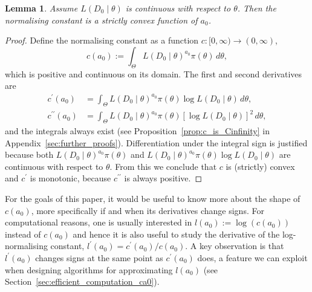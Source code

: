 \documentclass[a4paper, notitlepage, 11pt]{article}
\newtheorem{lemma}{Lemma}[]
\begin{document}
\begin{lemma}
\label{lm:convex_norm_constant}
Assume $L(D_0 \mid \theta)$ is continuous with respect to $\theta$.
Then the normalising constant is a strictly convex function of $a_0$.
\end{lemma}
\begin{proof}
Define the normalising constant as a function $c : [0, \infty) \to (0, \infty)$,
\begin{equation}
 \label{eq:normconst}
 c(a_0) := \int_{\Theta} L(D_0 \mid \theta)^{a_0} \pi(\theta)\, d\theta,
\end{equation}
which is positive and continuous on its domain.
The first and second derivatives are
\begin{align}
\label{eq:derivative_ca0}
c^\prime(a_0) &= \int_{\Theta} L(D_0 \mid \theta)^{a_0} \pi(\theta) \log L(D_0 \mid \theta) \, d\theta, \\
c^{\prime\prime}(a_0) &= \int_{\Theta} L(D_0 \mid \theta)^{a_0} \pi(\theta) [\log L(D_0 \mid \theta)]^2 \, d\theta,
\end{align}
and the integrals always exist (see Proposition~\ref{prop:c_is_Cinfinity} in Appendix~\ref{sec:further_proofs}).
Differentiation under the integral sign is justified because both $L(D_0 \mid \theta)^{a_0} \pi(\theta)$ and $L(D_0 \mid \theta)^{a_0} \pi(\theta) \log L(D_0 \mid \theta)$ are continuous with respect to $\theta$.
From this we conclude that $c$ is (strictly) convex and $c^\prime$ is monotonic, because $c^{\prime\prime}$ is always positive.
\end{proof}
For the goals of this paper, it would be useful to know more about the shape of $c(a_0)$, more specifically if and when its derivatives change signs.
For computational reasons, one is usually interested in $l(a_0) := \log(c(a_0)) $ instead of $c(a_0)$ and hence it is also useful to study the derivative of the log-normalising constant, $l^\prime(a_0) = c^\prime(a_0)/c(a_0)$.
A key observation is that $l^\prime(a_0)$ changes signs at the same point as $c^\prime(a_0)$ does, a feature we can exploit when designing algorithms for approximating $l(a_0)$ (see Section~\ref{sec:efficient_computation_ca0}).
\end{document}
